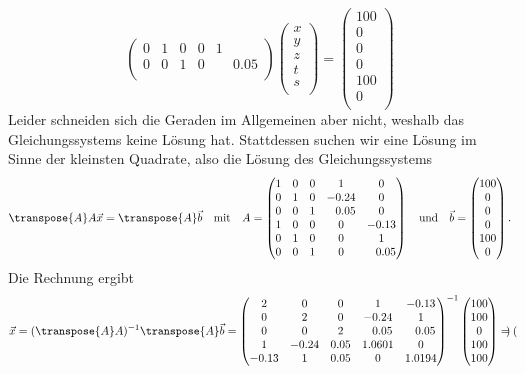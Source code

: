 \begin{loesung}
\[\begin{pmatrix}
0&1&0& 0 & 1\\
0&0&1& 0 & \phantom{-}0.05\\
\end{pmatrix}
\begin{pmatrix}
x\\y\\z\\ t\\s\\ 
\end{pmatrix}
= 
\begin{pmatrix}
100\\
0\\
0\\
0\\
100\\
0\\
\end{pmatrix}
\]
Leider schneiden sich die Geraden im Allgemeinen aber nicht,
weshalb das Gleichungssystems keine Lösung hat. Stattdessen
suchen wir eine Lösung im Sinne der kleinsten Quadrate, also die
Lösung des Gleichungssystems
\[
\transpose{A}A\vec x = \transpose{A}\vec b
\quad\text{mit}\quad 
A = \begin{pmatrix}
1&0&0& 1 & 0 \\
0&1&0&-0.24 & 0 \\
0&0&1& \phantom{-}0.05 & 0\\
1&0&0& 0 & -0.13\\
0&1&0& 0 & 1\\
0&0&1& 0 & \phantom{-}0.05\\
\end{pmatrix}
\quad\text{und}\quad
\vec b = \begin{pmatrix}
100\\
0\\
0\\
0\\
100\\
0\\
\end{pmatrix}.
\]
Die Rechnung ergibt 
\[
\vec x =  (\transpose{A}A)^{-1} \transpose{A}\vec b = 
\begin{pmatrix}
 2 & 0 & 0 & 1 & -0.13\\
 0 & 2 & 0 & -0.24 & 1\\
 0 & 0 & 2 & \phantom{-}0.05 & \phantom{-}0.05\\
 1 & -0.24 & 0.05 & 1.0601 & 0\\
 -0.13 & 1 & 0.05 & 0 & 1.0194\\
\end{pmatrix}^{-1}
\begin{pmatrix}
   100\\
   100\\
     0\\
   100\\
   100\\
\end{pmatrix}
=
\begin{pmatrix}
 

\end{pmatrix}\]
\end{loesung}
